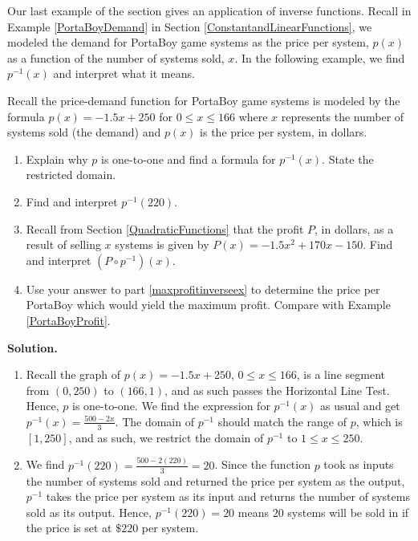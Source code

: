 \documentclass{ximera}
\begin{document}
Our last example of the section gives an application of inverse functions.  Recall in Example \ref{PortaBoyDemand} in Section \ref{ConstantandLinearFunctions}, we modeled the demand for PortaBoy game systems as the price per system, $p(x)$ as a function of the number of systems sold, $x$.  In the following example, we find $p^{-1}(x)$ and interpret what it means.



\begin{example} \label{demandfunctionofprice} Recall the price-demand function for PortaBoy game systems is modeled by the formula $p(x) = -1.5x + 250$ for $0 \leq x \leq 166$  where $x$ represents the number of systems sold (the demand) and $p(x)$ is the price per system, in dollars.  

\begin{enumerate}

\item  Explain why $p$ is one-to-one and find a formula for $p^{-1}(x)$.  State the restricted domain.

\item  Find and interpret $p^{-1}(220)$.

\item  \label{maxprofitinverseex} Recall from Section \ref{QuadraticFunctions} that the  profit $P$, in dollars, as a result of selling $x$ systems is given by $P(x)= -1.5x^2+170x-150$.  Find and interpret $\left( P \circ p^{-1}\right)(x)$.  

\item  Use your answer to part \ref{maxprofitinverseex} to determine the price per PortaBoy which would yield the maximum profit.  Compare with Example \ref{PortaBoyProfit}.

\end{enumerate}

{\bf Solution.}

\begin{enumerate}

\item  Recall the graph of $p(x) = -1.5x + 250$, $0 \leq x \leq 166$, is a line segment from $(0,250)$ to $(166,1)$, and as such passes the Horizontal Line Test.  Hence, $p$ is one-to-one.  We find the expression for $p^{-1}(x)$ as usual and get $p^{-1}(x) =  \frac{500-2x}{3}$.  The domain of $p^{-1}$ should match the range of $p$, which is $[1,250]$, and as such, we restrict the domain of $p^{-1}$ to $1 \leq x \leq 250$.  

\item  We find $p^{-1}(220) = \frac{500-2(220)}{3} = 20$.  Since the function $p$ took as inputs the number of systems sold and returned the price per system as the output, $p^{-1}$ takes the price per system as its input and returns the number of systems sold as its output.  Hence, $p^{-1}(220) = 20$ means $20$ systems will be sold in if the price is set at $\$ 220$ per system.


\end{enumerate}
\end{example}
\end{document}
